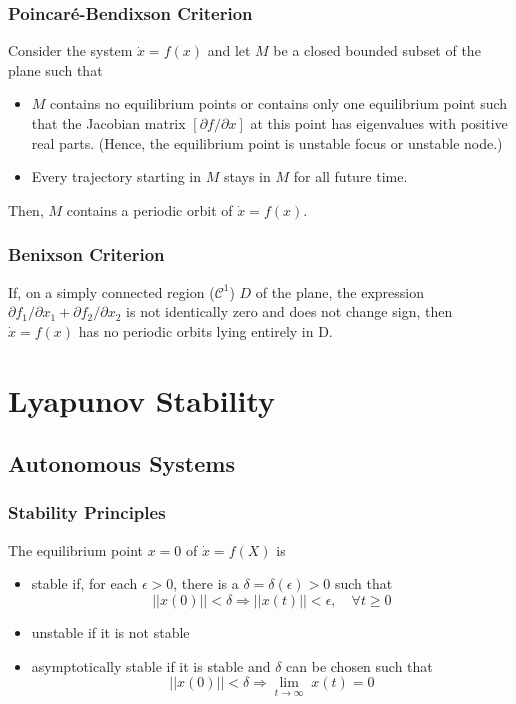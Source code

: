 \documentclass{article}
\begin{document}
\subsubsection{Poincaré-Bendixson Criterion}
Consider the system \(\dot x = f(x)\) and let $M$ be a closed bounded subset of
the plane such that
\begin{itemize}
	\item $M$ contains no equilibrium points or contains only one equilibrium point such that the Jacobian matrix $[\partial f / \partial x]$ at this point has eigenvalues with positive real parts. (Hence, the equilibrium point is unstable focus or unstable node.)
	\item  Every trajectory starting in $M$ stays in $M$ for all future time.
\end{itemize}
Then, $M$ contains a periodic orbit of $\dot x = f(x)$.
\subsubsection{Benixson Criterion}
If, on a simply connected region ($\mathcal{C}^1$) $D$ of the plane, the
expression $\partial f_1 / \partial x_1 + \partial f_2 / \partial x_2$ is not
identically zero and does not change sign, then $\dot x= f(x)$ has no periodic
orbits lying entirely in D. \newpage
\section{Lyapunov Stability}
\subsection{Autonomous Systems}
\subsubsection{Stability Principles}
The equilibrium point $x=0$ of $\dot x = f(X)$ is
\begin{itemize}
	\item stable if, for each $\epsilon > 0$, there is a $\delta = \delta(\epsilon) > 0$
	      such that
	      \begin{equation*}
		      ||x(0)|| < \delta \Rightarrow ||x(t)|| < \epsilon, \quad \forall t \geq 0
	      \end{equation*}
	\item unstable if it is not stable
	\item asymptotically stable if it is stable and $\delta$ can be chosen such that
	      \begin{equation*}
		      ||x(0)|| < \delta \Rightarrow \lim_{t\rightarrow \infty} \; x(t) = 0
	      \end{equation*}
\end{itemize}
\end{document}
